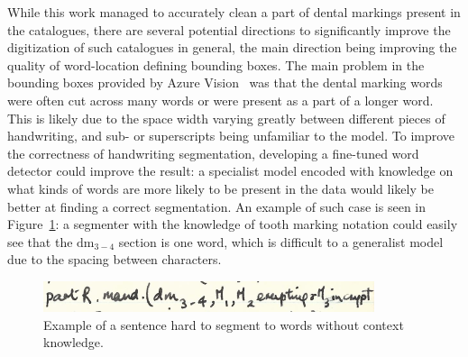 \documentclass[english,twoside,openright]{UH_DS_MSc}
\begin{document}

While this work managed to accurately clean a part of dental markings present in the catalogues, 
there are several potential directions to significantly improve the digitization of such catalogues in general, the main direction 
being improving the quality of word-location defining bounding boxes. The main problem in the bounding boxes provided 
by Azure Vision~\cite{azurevision} was that the dental marking words were often cut across many words or were present 
as a part of a longer word. This is likely due to the space width varying greatly between different pieces of 
handwriting, and sub- or superscripts being unfamiliar to the model. To improve the correctness of handwriting segmentation, developing a fine-tuned word detector 
could improve the result: a specialist model encoded with knowledge on what kinds of words are more likely to be 
present in the data would likely be better at finding a correct segmentation. An example of 
such case is seen in Figure~\ref{image:hardsentence}: a segmenter with the knowledge of tooth marking notation could 
easily see that the $\text{dm}_{3-4}$ section is one word, which is difficult to a generalist model 
due to the spacing between characters.

\begin{figure}[ht]
    \centering
    \includegraphics*[scale=0.8]{images/hardwordsegmentation.png}
    \caption{Example of a sentence hard to segment to words without context knowledge.}
    \label{image:hardsentence}
\end{figure}
\end{document}
